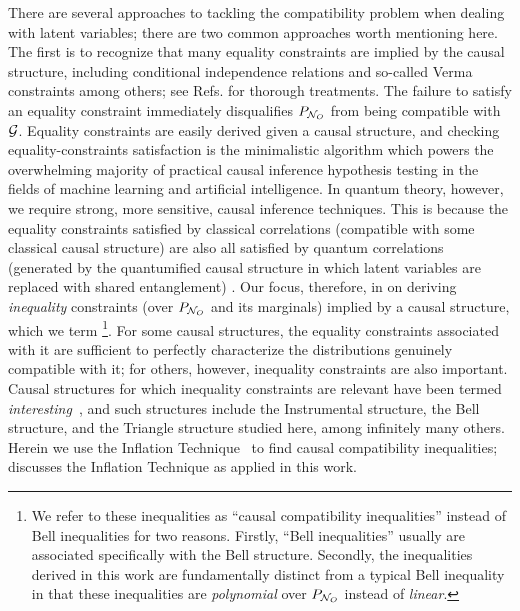 \documentclass[aps, 10pt, english, twoside, pra, nofootinbib, tightenlines, longbibliography, superscriptaddress]{revtex4-1}
\begin{document}
    There are several approaches to tackling the compatibility problem when dealing with latent variables; there are two common approaches worth mentioning here. The first is to recognize that many equality constraints are implied by the causal structure, including conditional independence relations and so-called Verma constraints among others; see Refs. \cite{evans2015margins,evans2017markov} for thorough treatments. The failure to satisfy an equality constraint immediately disqualifies $\prob[\nodes_{O}]$ from being compatible with $\mathcal{G}$. Equality constraints are easily derived given a causal structure, and checking equality-constraints satisfaction is the minimalistic algorithm which powers the overwhelming majority of practical causal inference hypothesis testing in the fields of machine learning and artificial intelligence. In quantum theory, however, we require strong, more sensitive, causal inference techniques. This is because the equality constraints satisfied by classical correlations (compatible with some classical causal structure) are also all satisfied by quantum correlations (generated by the quantumified causal structure in which latent variables are replaced with shared entanglement) \cite{Henson_2014}.
    Our focus, therefore, in on deriving \emph{inequality} constraints (over $\prob[\nodes_{O}]$ and its marginals) implied by a causal structure, which we term \footnote{We refer to these inequalities as ``causal compatibility inequalities'' instead of Bell inequalities for two reasons. Firstly, ``Bell inequalities'' usually are associated specifically with the Bell structure. Secondly, the inequalities derived in this work are fundamentally distinct from a typical Bell inequality in that these inequalities are \textit{polynomial} over $\prob[\nodes_{O}]$ instead of \textit{linear}.}. For some causal structures, the equality constraints associated with it are sufficient to perfectly characterize the distributions genuinely compatible with it; for others, however, inequality constraints are also important. Causal structures for which inequality constraints are relevant have been termed \textit{interesting}~\cite{Henson_2014}, and such structures include the Instrumental structure, the Bell structure, and the Triangle structure studied here, among infinitely many others.
    Herein we use the Inflation Technique~\cite{Inflation} to find causal compatibility inequalities;  discusses the Inflation Technique as applied in this work.
\end{document}
